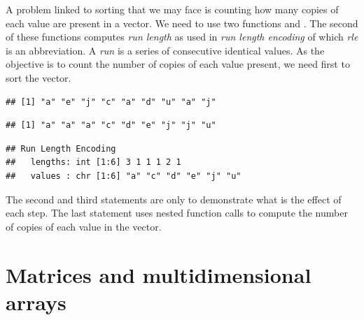 \documentclass[krantz2]{krantz}\usepackage{knitr}%
\begin{document}
\begin{explainbox}
A problem linked to sorting that we may face is counting how many copies of each value are present in a vector. We need to use two functions  and . The second of these functions computes \emph{run length} as used in \emph{run length encoding} of which \emph{rle} is an abbreviation. A \emph{run} is a series of consecutive identical values. As the objective is to count the number of copies of each value present, we need first to sort the vector.

\begin{knitrout}\footnotesize
{}\color{fgcolor}\begin{kframe}
\begin{alltt}
 \hlkwb{<-} \hlstd{letters[}\hlstd{(}\hlstd{,}\hlstd{,}\hlstd{,}\hlstd{,}\hlstd{,}\hlstd{,}\hlstd{,}\hlstd{,}\hlstd{)]}
\end{alltt}
\begin{verbatim}
## [1] "a" "e" "j" "c" "a" "d" "u" "a" "j"
\end{verbatim}
\begin{alltt}
\end{alltt}
\begin{verbatim}
## [1] "a" "a" "a" "c" "d" "e" "j" "j" "u"
\end{verbatim}
\begin{alltt}
\hlstd{(}
\end{alltt}
\begin{verbatim}
## Run Length Encoding
##   lengths: int [1:6] 3 1 1 1 2 1
##   values : chr [1:6] "a" "c" "d" "e" "j" "u"
\end{verbatim}
\end{kframe}
\end{knitrout}

The second and third statements are only to demonstrate what is the effect of each step. The last statement uses nested function calls to compute the number of copies of each value in the vector.
\end{explainbox}




\section{Matrices and multidimensional arrays}\label{sec:matrix:array}
\end{document}
